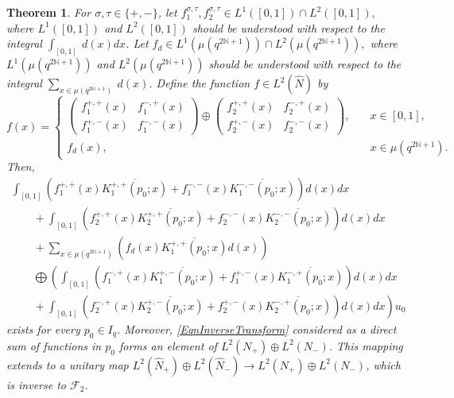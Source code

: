 \documentclass[pdftex]{sigma}
\numberwithin{equation}{section}
\newtheorem{thm}{Theorem}[section]
\theoremstyle{definition}
\begin{document}
\begin{thm}
For   $\sigma, \tau \in \{+, -\}$, let
$
f_1^{\sigma, \tau},   f_2^{\sigma, \tau}  \in L^1([0,1]) \cap L^2([0,1]),
$
where $L^1([0,1])$ and $L^2([0,1])$ should be understood with respect to the integral $\int_{[0,1]} \: d(x)dx$. Let
$
f_d \in L^1(\mu(q^{2\mathbb{N}+1}) ) \cap  L^2(\mu(q^{2\mathbb{N}+1}) ),
$
where  $L^1(\mu(q^{2\mathbb{N}+1}) )$ and $L^2(\mu(q^{2\mathbb{N}+1}) )$ should be understood with respect to the integral $\sum_{x \in \mu(q^{2\mathbb{N}+1}) }\:  d(x)$.
 Define the function $f \in L^2(\hat{N})$ by
\[
f(x) = \left\{
\begin{array}{ll}
\left(
\begin{array}{ll}
f_1^{+,+}(x) & f_1^{-,+}(x) \\
f_1^{+,-}(x) & f_1^{-,-}(x)
\end{array}
\right)
\oplus
\left(
\begin{array}{ll}
f_2^{+,+}(x) & f_2^{-,+}(x) \\
f_2^{+,-}(x) & f_2^{-,-}(x)
\end{array}
\right), \quad
&
x \in [0,1], \\
f_d(x), & x \in \mu(q^{2\mathbb{N}+1}).
\end{array}
\right.
\]
Then,
\begin{gather}
  \int_{[0,1]} \left( f_1^{+,+}(x) \overline{K_1^{+,+}(p_0;x)}  + f_1^{-,-}(x) \overline{K_1^{-,-}(p_0;x)} \right) d(x) dx
  \nonumber\\
 \qquad{}+   \int_{[0,1]}  \left( f_2^{+,+}(x) \overline{K_2^{+,+}(p_0;x)}  +  f_2^{-,-}(x) \overline{K_2^{-,-}(p_0;x)} \right) d(x) dx\nonumber\\
  \qquad{}
+   \sum_{x \in \mu(q^{2\mathbb{N}+1})} \left( f_d(x) \overline{ K_1^{+,+}(p_0; x)} d(x) \right)\nonumber \\
\qquad{} \bigoplus  \left( \int_{[0,1]} \left( f_1^{-,+}(x) \overline{K_1^{+,-}(p_0;x)}  + f_1^{+,-}(x) \overline{K_1^{-,+}(p_0;x)} \right) d(x) dx \right.
\nonumber\\ \left.\qquad{}+    \int_{[0,1]} \left( f_2^{-,+}(x) \overline{K_2^{+,-}(p_0;x)}  +  f_2^{+,-}(x) \overline{K_2^{-,+}(p_0;x)} \right)  d(x) dx  \right)  u_0\label{EqnInverseTransform}
\end{gather}
exists for every $p_0 \in I_q$. Moreover, \eqref{EqnInverseTransform} considered as a direct sum of functions in $p_0$ forms an element of $L^2(N_+) \oplus L^2(N_-)$. This mapping extends to a unitary map $L^2(\hat{N}_+) \oplus L^2(\hat{N}_-) \rightarrow L^2(N_+) \oplus L^2(N_-)$, which is inverse to $\mathcal{F}_2$.
\end{thm}
\end{document}
